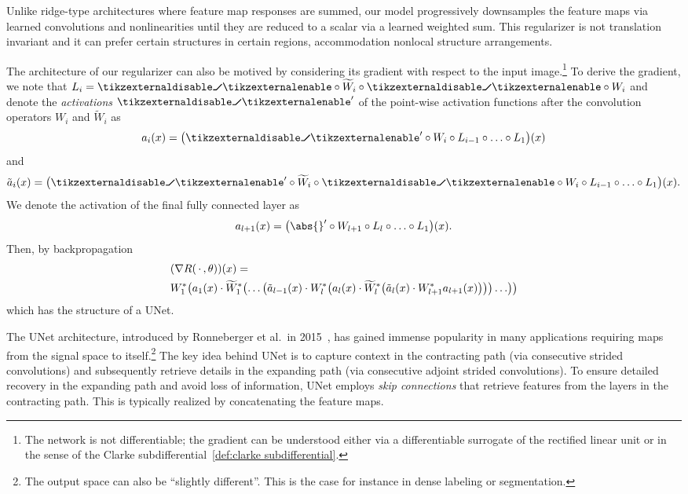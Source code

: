 Unlike ridge-type architectures where feature map responses are summed, our model progressively downsamples the feature maps via learned convolutions and nonlinearities until they are reduced to a scalar via a learned weighted sum.
This regularizer is not translation invariant and  it can prefer certain structures in certain regions, accommodation nonlocal structure arrangements.

The architecture of our regularizer can also be motived by considering its gradient with respect to the input image.\footnote{%
	The network is not differentiable; the gradient can be understood either via a differentiable surrogate of the rectified linear unit or in the sense of the Clarke subdifferential~\cref{def:clarke subdifferential}.
}
To derive the gradient, we note that \( L_i = \relu \circ \widetilde{W}_i \circ \relu \circ W_i \) and denote the \emph{activations} \( \relu^\prime \) of the point-wise activation functions after the convolution operators \( W_i \) and \( \widetilde{W}_i \) as
\begin{equation}
	a_i(x) = \bigl(\relu^\prime \circ W_i \circ L_{i-1} \circ \ldots \circ L_{\num{1}}\bigr)(x)
\end{equation}
and
\begin{equation}
	\tilde{a}_i(x) = \bigl(\relu^\prime \circ \widetilde{W}_i \circ \relu \circ W_i \circ L_{i-1} \circ \ldots \circ L_{\num{1}}\bigr)(x).
\end{equation}
We denote the activation of the final fully connected layer as
\begin{equation}
	a_{l + 1}(x) = \bigl( \abs{}^\prime \circ W_{l+1} \circ L_l \circ \ldots \circ L_{\num{1}} \bigr)(x).
\end{equation}
Then, by backpropagation
\begin{equation}
	\begin{aligned}
		&(\nabla R(\,\cdot\,, \theta))(x) = \\
		&W_{\num{1}}^{\ast} \bigl( a_{\num{1}}(x) \cdot \widetilde{W}_{\num{1}}^{\ast} \bigl( \ldots \bigl( \tilde{a}_{l-1}(x) \cdot W_l^{\ast} \bigl( a_l(x) \cdot \widetilde{W}_{l}^{\ast}\bigl(\tilde{a}_l(x) \cdot W_{l+1}^{\ast} a_{l+1}(x) \bigr) \bigr) \bigr) \ldots \bigr) \bigr)
	\end{aligned}
\end{equation}
which has the structure of a UNet.

The UNet architecture, introduced by Ronneberger et al.\ in 2015~\cite{ronneberger_unet_2015}, has gained immense popularity in many applications requiring maps from the signal space to itself.\footnote{%
	The output space can also be \enquote{slightly different}. This is the case for instance in dense labeling or segmentation.
}
The key idea behind UNet is to capture context in the contracting path (via consecutive strided convolutions) and subsequently retrieve details in the expanding path (via consecutive adjoint strided convolutions).
To ensure detailed recovery in the expanding path and avoid loss of information, UNet employs \emph{skip connections} that retrieve features from the layers in the contracting path.
This is typically realized by concatenating the feature maps.

